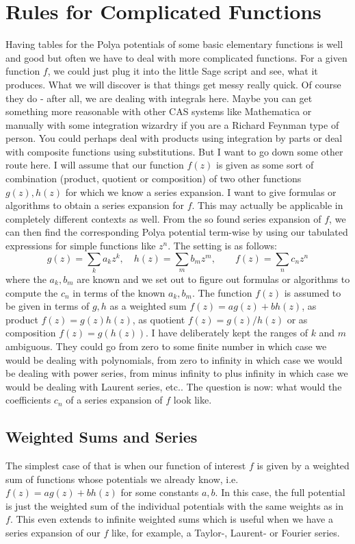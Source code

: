 \documentclass[12pt]{article}
\begin{document}
\section{Rules for Complicated Functions}
Having tables for the Polya potentials of some basic elementary functions is well and good but often we have to deal with more complicated functions. For a given function $f$, we could just plug it into the little Sage script and see, what it produces. What we will discover is that things get messy really quick. Of course they do - after all, we are dealing with integrals here. Maybe you can get something more reasonable with other CAS systems like Mathematica or manually with some integration wizardry if you are a Richard Feynman type of person. You could perhaps deal with products using integration by parts or deal with composite functions using substitutions. But I want to go down some other route here. I will assume that our function $f(z)$ is given as some sort of combination (product, quotient or composition) of two other functions $g(z), h(z)$ for which we know a series expansion. I want to give formulas or algorithms to obtain a series expansion for $f$. This may actually be applicable in completely different contexts as well. From the so found series expansion of $f$, we can then find the corresponding Polya potential term-wise by using our tabulated expressions for simple functions like $z^n$. The setting is as follows:
\begin{equation}
g(z) = \sum_k a_k z^k, \quad
h(z) = \sum_m b_m z^m, \qquad
f(z) = \sum_n c_n z^n
\end{equation}
where the $a_k, b_m$ are known and we set out to figure out formulas or algorithms to compute the $c_n$ in terms of the known $a_k, b_m$. The function $f(z)$ is assumed to be given in terms of $g,h$ as a weighted sum $f(z) = a g(z) + b h(z)$, as product $f(z) = g(z) h(z)$, as quotient $f(z) = g(z) / h(z)$ or as composition $f(z) = g(h(z))$. I have deliberately kept the ranges of $k$ and $m$ ambiguous. They could go from zero to some finite number in which case we would be dealing with polynomials, from zero to infinity in which case we would be dealing with power series, from minus infinity to plus infinity in which case we would be dealing with Laurent series, etc.. The question is now: what would the coefficients $c_n$ of a series expansion of $f$ look like.

\subsection{Weighted Sums and Series}
The simplest case of that is when our function of interest $f$ is given by a weighted sum of functions whose potentials we already know, i.e. $f(z) = a g(z) + b h(z)$ for some constants $a,b$. In this case, the full potential is just the weighted sum of the individual potentials with the same weights as in $f$. This even extends to infinite weighted sums which is useful when we have a series expansion of our $f$ like, for example, a Taylor-, Laurent- or Fourier series. 
\end{document}
